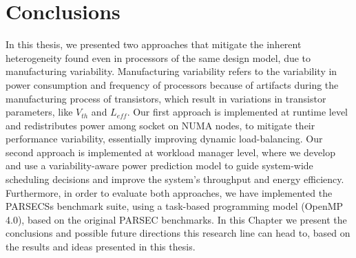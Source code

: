 
\chapter{Conclusions}
\label{chap:conclusions}

In this thesis, we presented two approaches that mitigate the inherent heterogeneity found
even in processors of the same design model, due to manufacturing variability.
Manufacturing variability refers to the variability in power consumption and frequency of
processors because of artifacts during the manufacturing process of transistors, which
result in variations in transistor parameters, like $V_{th}$ and $L_{eff}$.  Our first
approach is implemented at runtime level and redistributes power among socket on NUMA
nodes, to mitigate their performance variability, essentially improving dynamic
load-balancing.  Our second approach is implemented at workload manager level, where we
develop and use a variability-aware power prediction model to guide system-wide scheduling
decisions and improve the system's throughput and energy efficiency.  Furthermore, in
order to evaluate both approaches, we have implemented the PARSECSs benchmark suite, using
a task-based programming model (OpenMP 4.0), based on the original PARSEC benchmarks.  In
this Chapter we present the conclusions and possible future directions this research line
can head to, based on the results and ideas presented in this thesis. 

